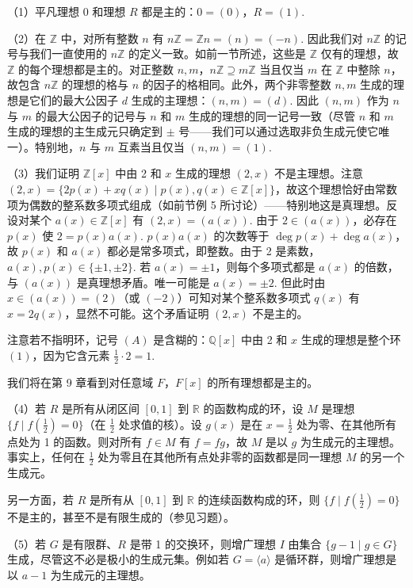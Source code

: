 \begin{example}
（1）平凡理想 0 和理想 \(R\) 都是主的：\(0 = (0)\)，\(R = (1)\).

（2）在 \(\mathbb{Z}\) 中，对所有整数 \(n\) 有 \(n\mathbb{Z} = \mathbb{Z}n = (n) = (-n)\). 因此我们对 \(n\mathbb{Z}\) 的记号与我们一直使用的 \(n\mathbb{Z}\) 的定义一致。如前一节所述，这些是 \(\mathbb{Z}\) 仅有的理想，故 \(\mathbb{Z}\) 的每个理想都是主的。对正整数 \(n, m\)，\(n\mathbb{Z} \supseteq m\mathbb{Z}\) 当且仅当 \(m\) 在 \(\mathbb{Z}\) 中整除 \(n\)，故包含 \(n\mathbb{Z}\) 的理想的格与 \(n\) 的因子的格相同。此外，两个非零整数 \(n, m\) 生成的理想是它们的最大公因子 \(d\) 生成的主理想：\((n, m) = (d)\). 因此 \((n, m)\) 作为 \(n\) 与 \(m\) 的最大公因子的记号与 \(n\) 和 \(m\) 生成的理想的同一记号一致（尽管 \(n\) 和 \(m\) 生成的理想的主生成元只确定到 \(\pm\) 号——我们可以通过选取非负生成元使它唯一）。特别地，\(n\) 与 \(m\) 互素当且仅当 \((n, m) = (1)\).

（3）我们证明 \(\mathbb{Z}[x]\) 中由 2 和 \(x\) 生成的理想 \((2, x)\) 不是主理想。注意 \((2, x) = \{2p(x) + xq(x) \mid p(x), q(x) \in \mathbb{Z}[x]\}\)，故这个理想恰好由常数项为偶数的整系数多项式组成（如前节例 5 所讨论）——特别地这是真理想。反设对某个 \(a(x) \in \mathbb{Z}[x]\) 有 \((2, x) = (a(x))\). 由于 \(2 \in (a(x))\)，必存在 \(p(x)\) 使 \(2 = p(x)a(x)\). \(p(x)a(x)\) 的次数等于 \(\deg p(x) + \deg a(x)\)，故 \(p(x)\) 和 \(a(x)\) 都必是常多项式，即整数。由于 2 是素数，\(a(x), p(x) \in \{\pm 1, \pm 2\}\). 若 \(a(x) = \pm 1\)，则每个多项式都是 \(a(x)\) 的倍数，与 \((a(x))\) 是真理想矛盾。唯一可能是 \(a(x) = \pm 2\). 但此时由 \(x \in (a(x)) = (2)\)（或 \((-2)\)）可知对某个整系数多项式 \(q(x)\) 有 \(x = 2q(x)\)，显然不可能。这个矛盾证明 \((2, x)\) 不是主的。

注意若不指明环，记号 \((A)\) 是含糊的：\(\mathbb{Q}[x]\) 中由 2 和 \(x\) 生成的理想是整个环 \((1)\)，因为它含元素 \(\frac{1}{2} \cdot 2 = 1\).

我们将在第 9 章看到对任意域 \(F\)，\(F[x]\) 的所有理想都是主的。

（4）若 \(R\) 是所有从闭区间 \([0,1]\) 到 \(\mathbb{R}\) 的函数构成的环，设 \(M\) 是理想 \(\{f \mid f(\tfrac12) = 0\}\)（在 \(\frac{1}{2}\) 处求值的核）。设 \(g(x)\) 是在 \(x = \frac{1}{2}\) 处为零、在其他所有点处为 1 的函数。则对所有 \(f \in M\) 有 \(f = fg\)，故 \(M\) 是以 \(g\) 为生成元的主理想。事实上，任何在 \(\frac{1}{2}\) 处为零且在其他所有点处非零的函数都是同一理想 \(M\) 的另一个生成元。

另一方面，若 \(R\) 是所有从 \([0,1]\) 到 \(\mathbb{R}\) 的连续函数构成的环，则 \(\{f \mid f(\tfrac12) = 0\}\) 不是主的，甚至不是有限生成的（参见习题）。

（5）若 \(G\) 是有限群、\(R\) 是带 1 的交换环，则增广理想 \(I\) 由集合 \(\{g - 1 \mid g \in G\}\) 生成，尽管这不必是极小的生成元集。例如若 \(G = \langle a \rangle\) 是循环群，则增广理想是以 \(a-1\) 为生成元的主理想。
\end{example}


